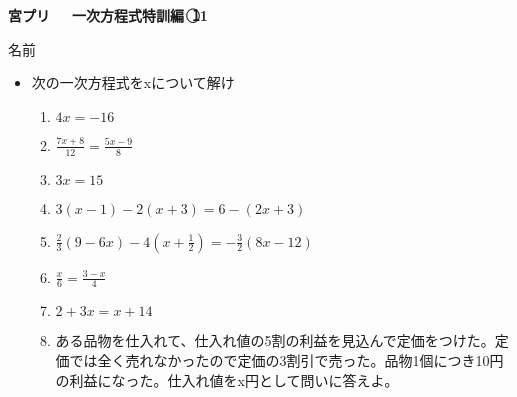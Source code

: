 \documentclass[a4paper,fleqn,papersize,15pt]{jsarticle}
\begin{document}
\clearpage
 \begin{center}
   \LARGE\textbf{宮プリ　~一次方程式特訓編~\textcircled{\scriptsize 11}}
     \begin{flushright}
       名前\underline{\hspace{8zw}}
     \end{flushright}
 \end{center}

 \begin{itemize}
   \item 次の一次方程式をxについて解け
   \begin{enumerate}
\item $4x=-16$ \begin{flushright}\framebox[8em]{\rule{0pt}{6ex}}\end{flushright} %
\item $\frac{7x+8}{12} = \frac{5x-9}{8}$ \begin{flushright}\framebox[8em]{\rule{0pt}{6ex}}\end{flushright} %
\item $3x=15$ \begin{flushright}\framebox[8em]{\rule{0pt}{6ex}}\end{flushright} %
\item $3(x-1)-2(x+3)=6-(2x+3)$ \begin{flushright}\framebox[8em]{\rule{0pt}{6ex}}\end{flushright} %
\item $\frac{2}{3} (9-6x)-4(x+ \frac{1}{2} )=- \frac{3}{2} (8x-12)$ \begin{flushright}\framebox[8em]{\rule{0pt}{6ex}}\end{flushright} %
\item $\frac{x}{6} = \frac{3-x}{4}$ \begin{flushright}\framebox[8em]{\rule{0pt}{6ex}}\end{flushright} %
\item $2+3x=x+14$ \begin{flushright}\framebox[8em]{\rule{0pt}{6ex}}\end{flushright} %
\item ある品物を仕入れて、仕入れ値の5割の利益を見込んで定価をつけた。定価では全く売れなかったので定価の3割引で売った。品物1個につき10円の利益になった。仕入れ値をx円として問いに答えよ。 \vfill \begin{flushright}\framebox[8em]{\rule{0pt}{6ex}}\end{flushright} %
\begin{enumerate}

\end{enumerate}
\end{enumerate}
\end{itemize}
\end{document}

